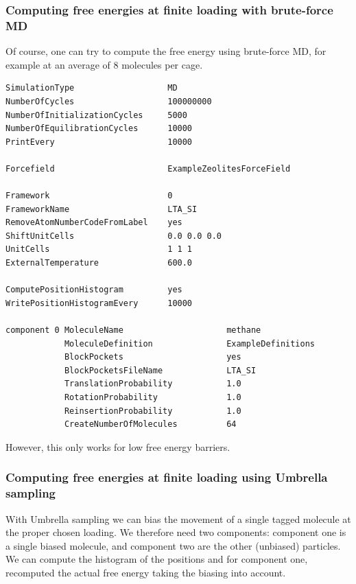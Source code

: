\subsubsection{Computing free energies at finite loading with brute-force MD}

Of course, one can try to compute the free energy using brute-force MD, for example at an average of 8 molecules per cage.
\begin{tiny}
\begin{verbatim}
SimulationType                   MD
NumberOfCycles                   100000000
NumberOfInitializationCycles     5000
NumberOfEquilibrationCycles      10000
PrintEvery                       10000

Forcefield                       ExampleZeolitesForceField

Framework                        0
FrameworkName                    LTA_SI
RemoveAtomNumberCodeFromLabel    yes
ShiftUnitCells                   0.0 0.0 0.0
UnitCells                        1 1 1
ExternalTemperature              600.0

ComputePositionHistogram         yes
WritePositionHistogramEvery      10000

component 0 MoleculeName                     methane
            MoleculeDefinition               ExampleDefinitions
            BlockPockets                     yes
            BlockPocketsFileName             LTA_SI
            TranslationProbability           1.0
            RotationProbability              1.0
            ReinsertionProbability           1.0
            CreateNumberOfMolecules          64
\end{verbatim}
\end{tiny}

However, this only works for low free energy barriers.

\subsubsection{Computing free energies at finite loading using Umbrella sampling}

With Umbrella sampling we can bias the movement of a single tagged molecule at the proper chosen loading.
We therefore need two components: component one is a single biased molecule, and component two are the
other (unbiased) particles.
We can compute the histogram of the positions and for component one, recomputed the actual free energy
taking the biasing into account.

